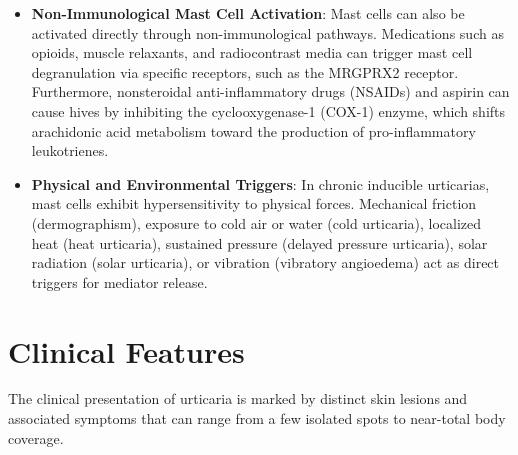 \begin{itemize}
    \item \textbf{Non-Immunological Mast Cell Activation}: Mast cells can also be activated directly through non-immunological pathways. Medications such as opioids, muscle relaxants, and radiocontrast media can trigger mast cell degranulation via specific receptors, such as the MRGPRX2 receptor. Furthermore, nonsteroidal anti-inflammatory drugs (NSAIDs) and aspirin can cause hives by inhibiting the cyclooxygenase-1 (COX-1) enzyme, which shifts arachidonic acid metabolism toward the production of pro-inflammatory leukotrienes.
    \item \textbf{Physical and Environmental Triggers}: In chronic inducible urticarias, mast cells exhibit hypersensitivity to physical forces. Mechanical friction (dermographism), exposure to cold air or water (cold urticaria), localized heat (heat urticaria), sustained pressure (delayed pressure urticaria), solar radiation (solar urticaria), or vibration (vibratory angioedema) act as direct triggers for mediator release.
\end{itemize}

\section*{Clinical Features}
The clinical presentation of urticaria is marked by distinct skin lesions and associated symptoms that can range from a few isolated spots to near-total body coverage.

